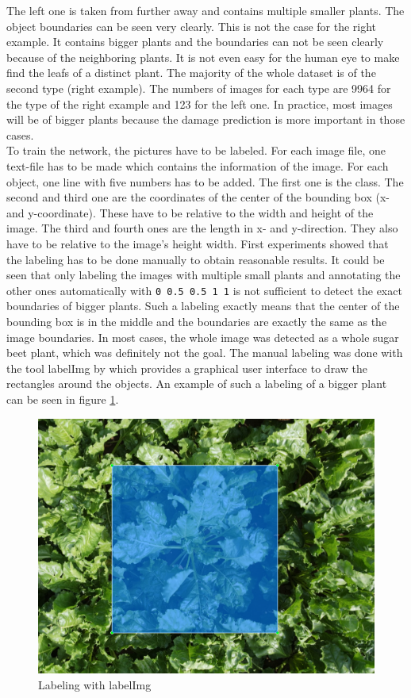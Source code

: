 The left one is taken from further away and contains multiple smaller plants. The object boundaries can be seen very clearly. This is not the case for the right example. It contains bigger plants and the boundaries can not be seen clearly because of the neighboring plants. It is not even easy for the human eye to make find the leafs of a distinct plant. The majority of the whole dataset is of the second type (right example). The numbers of images for each type are 9964 for the type of the right example and 123 for the left one. In practice, most images will be of bigger plants because the damage prediction is more important in those cases.\\

To train the network, the pictures have to be labeled. For each image file, one text-file has to be made which contains the information of the image. For each object, one line with five numbers has to be added. The first one is the class. The second and third one are the coordinates of the center of the bounding box (x- and y-coordinate). These have to be relative to the width and height of the image. The third and fourth ones are the length in x- and y-direction. They also have to be relative to the image's height width. First experiments showed that the labeling has to be done manually to obtain reasonable results. It could be seen that only labeling the images with multiple small plants and annotating the other ones automatically with \texttt{0 0.5 0.5 1 1} is not sufficient to detect the exact boundaries of bigger plants. Such a labeling exactly means that the center of the bounding box is in the middle and the boundaries are exactly the same as the image boundaries. In most cases, the whole image was detected as a whole sugar beet plant, which was definitely not the goal. The manual labeling was done with the tool labelImg by \cite{labelimg} which provides a graphical user interface to draw the rectangles around the objects. An example of such a labeling of a bigger plant can be seen in figure \ref{fig:labeling}.

\begin{figure}[htb!]
	\centering
	\includegraphics[scale=0.2]{figures/labeling.png}
	\caption{Labeling with labelImg}
	\label{fig:labeling}
\end{figure}

